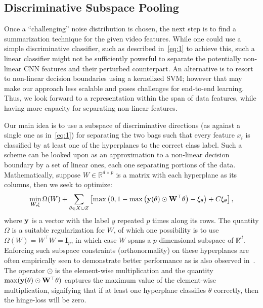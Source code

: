 \documentclass[runningheads]{llncs}
\newcommand{\reals}[1]{\mathbb{R}^{#1}}
\newcommand{\eye}[1]{\mathbf{I}_{#1}}
\begin{document}
\subsection{Discriminative Subspace Pooling}
Once a ``challenging'' noise distribution is chosen, the next step is to find a summarization technique for the given video features. While one could use a simple discriminative classifier, such as described in~\eqref{eq:1} to achieve this, such a linear classifier might not be sufficiently powerful to separate the potentially non-linear CNN features and their perturbed counterpart. An alternative is to resort to non-linear decision boundaries using a kernelized SVM; however that may make our approach less scalable and poses challenges for end-to-end learning. Thus, we look forward to a representation within the span of data features, while having more capacity for separating non-linear features.  

Our main idea is to use a subspace of discriminative directions (as against a single one as in~\eqref{eq:1}) for separating the two bags such that every feature $x_i$ is classified by at least one of the hyperplanes to the correct class label. Such a scheme can be looked upon as an approximation to a non-linear decision boundary by a set of linear ones, each one separating portions of the data. Mathematically, suppose $W\in\reals{d\times p}$ is a matrix with each hyperplane as its columns, then we seek to optimize:
\begin{equation}
\min_{W, \xi} \Omega(W) + \sum_{\theta \in X\cup Z} \left[\max\left(0, 1-\max\left(\bf{y}(\theta) \odot W^\top \theta\right) - \xi_{\theta}\right) + C\xi_{\theta}\right],
\label{eq:2}
\end{equation}
where $\bf{y}$ is a vector with the label $y$ repeated $p$ times along its rows. The quantity $\Omega$ is a suitable regularization for $W$, of which one possibility is to use $\Omega(W) = W^\top W = \eye{p}$, in which case $W$ spans a $p$ dimensional subspace of $\reals{d}$. Enforcing such subspace constraints (orthonormality) on these hyperplanes are often empirically seen to demonstrate better performance as is also observed in~\cite{grp}. The operator $\odot$ is the element-wise multiplication and the quantity $\max(\bf{y}(\theta) \odot W^\top \theta)$ captures the maximum value of the element-wise multiplication, signifying that if at least one hyperplane classifies $\theta$ correctly, then the hinge-loss will be zero. 
\end{document}
